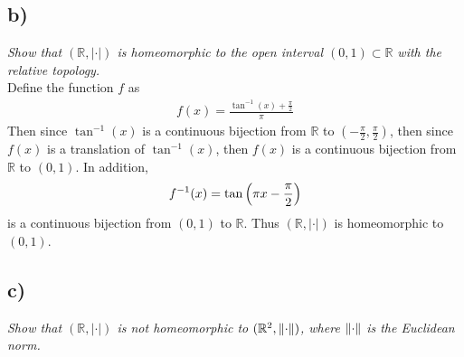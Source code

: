 \documentclass[12pt]{article}
\theoremstyle{plain}
\begin{document}
\subsection*{ b)}
\emph{Show that $(\mathbb{R}, |\cdot|)$ is homeomorphic to the open interval $(0,1) \subset \mathbb{R}$ with the relative topology.} \\

Define the function $f$ as
\begin{align*}
    f(x) = \frac{\tan^{-1}(x) + \frac{\pi}{2}}{\pi}
\end{align*}
Then since $\tan^{-1}(x)$ is a continuous bijection from $\mathbb{R}$ to $(-\frac{\pi}{2}, \frac{\pi}{2})$, then since $f(x)$ is a translation of $\tan^{-1}(x)$, then $f(x)$ is a continuous bijection from $\mathbb{R}$ to $(0,1)$.  In addition,
\begin{align*}
    f^{-1}(x) = \tan\qty(\pi x - \frac{\pi}{2})
\end{align*}
is a continuous bijection from $(0,1)$ to $\mathbb{R}$.  Thus $(\mathbb{R}, |\cdot|)$ is homeomorphic to $(0,1)$.

\subsection*{ c)}
\emph{Show that $(\mathbb{R}, |\cdot|)$ is not homeomorphic to $(\mathbb{R}^2, \norm{\cdot})$, where $\norm{\cdot}$ is the Euclidean norm.} \\
\end{document}

